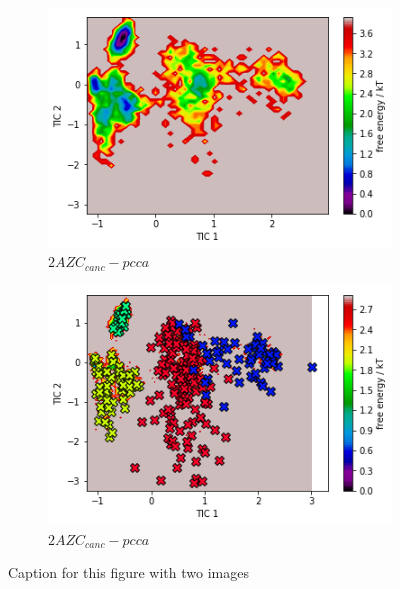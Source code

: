 \documentclass[fleqn,10pt]{wlscirep}
\begin{document}
\begin{figure}[!ht]
\centering
\begin{subfigure}{.5\textwidth}
  \centering
  \includegraphics[width=.9\linewidth]{2AZC_canc/2AZC_canc-tica.png}
  \caption{$2AZC_{canc}-pcca$}
  \label{fig:2AZC_canc-tica}
\end{subfigure}%
\begin{subfigure}{.5\textwidth}
  \centering
  \includegraphics[width=.9\linewidth]{2AZC_canc/2AZC_canc-pcca.png}
  \caption{$2AZC_{canc}-pcca$}
  \label{fig:2AZC_canc-pcca}
\end{subfigure}
\caption{Caption for this figure with two images}
\label{fig:2AZC_canc-cluster}
\end{figure}
\end{document}
